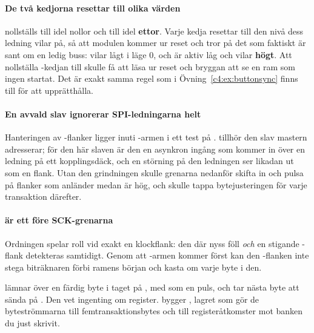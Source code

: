 \paragraph{De två kedjorna resettar till olika värden}
 nollställs till idel nollor och  till idel \textbf{ettor}. Varje kedja
resettar till den nivå dess ledning vilar på, så att modulen kommer ur reset och tror på det som
faktiskt är sant om en ledig buss:  vilar lågt i läge 0, och  är aktiv låg och
vilar \textbf{högt}. Att nollställa -kedjan till  skulle få  att
läsa  ur reset och bryggan att se en ram som ingen startat. Det är exakt samma regel som
 i Övning~\ref{c4:ex:buttonsync} finns till för att upprätthålla.

\paragraph{En avvald slav ignorerar SPI-ledningarna helt}
Hanteringen av -flanker ligger inuti -armen i ett test på .
 tillhör den slav mastern adresserar; för den här slaven är den en asynkron ingång som
kommer in över en ledning på ett kopplingsdäck, och en störning på den ledningen ser likadan ut som
en flank. Utan den grindningen skulle grenarna nedanför skifta in  och pulsa
 på flanker som anländer medan  är hög, och  skulle
tappa bytejusteringen för varje transaktion därefter.

\paragraph{ är ett  före SCK-grenarna}
Ordningen spelar roll vid exakt en klockflank: den där  nyss föll \emph{och} en stigande
-flank detekteras samtidigt. Genom att -armen kommer först kan den
-flanken inte stega biträknaren förbi ramens början och kasta om varje byte i den.

 lämnar över en färdig byte i taget på , med  som en
puls, och tar nästa byte att sända på . Den vet ingenting om register.
 bygger , lagret som gör de byteströmmarna till
femtransaktionsbytes och till registeråtkomster mot banken du just skrivit.
